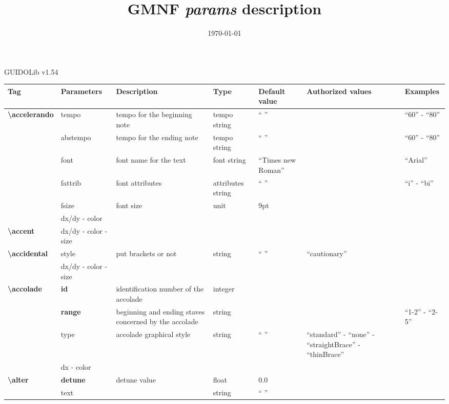 \documentclass[a4paper, landscape, 10pt]{article}
\makeatletter
\renewcommand{\maketitle}{
    \begin{center}
      \large
      {\LARGE\@title}
      \par\vspace{1ex}
      GUIDOLib v1.54
    \end{center}
}
\makeatother
\begin{document}
\title{GMNF \emph{params} description}
\date{\today}

\maketitle

\setlength{\parindent}{0pt}

\renewcommand{\tabularxcolumn}[1]{m{#1}}

\begin{tabularx}{\linewidth}{p{3cm}p{3cm}p{6cm}p{2.5cm}p{2.5cm}p{3.5cm}p{3.5cm}}
    \hline
    \textbf{Tag}&\textbf{Parameters}&\textbf{Description}&\textbf{Type}&\textbf{Default value}&\textbf{Authorized values}&\textbf{Examples}\\
    \hline
    \textbf{\textbackslash{}accelerando}&tempo&tempo for the beginning note&tempo string&`` ''&&``60'' - ``80''\\
    &abstempo&tempo for the ending note&tempo string&`` ''&&``60'' - ``80''\\
    &font&font name for the text&font string&``Times new Roman''&&``Arial''\\
    &fattrib&font attributes&attributes string&`` ''&&``i'' - ``bi''\\
    &fsize&font size&unit&9pt&&\\
    &dx/dy - color&&&&&\\
    \hline
    \textbf{\textbackslash{}accent}&dx/dy - color - size&&&&&\\
    \hline
    \textbf{\textbackslash{}accidental}&style&put brackets or not&string&`` ''&``cautionary''&\\
    &dx/dy - color - size&&&&&\\
    \hline
    \textbf{\textbackslash{}accolade}&\textbf{id}&identification number of the accolade&integer&&&\\
    &\textbf{range}&beginning and ending staves concerned by the accolade&string&&&``1-2'' - ``2-5''\\
    &type&accolade graphical style&string&`` ''&``standard'' - ``none'' - ``straightBrace'' - ``thinBrace''&\\
    &dx - color&&&&&\\
    \hline
    \textbf{\textbackslash{}alter}&\textbf{detune}&detune value&float&0.0&&\\
    &text&&string&`` ''&&\\ %
    \hline

\end{tabularx}
\end{document}
